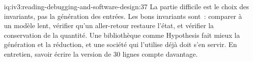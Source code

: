 \begin{solution}{iq:iv3:reading-debugging-and-software-design:37}
La partie difficile est le choix des invariants, pas la génération des entrées. Les bons invariants sont~: comparer à un modèle lent, vérifier qu'un aller-retour restaure l'état, et vérifier la conservation de la quantité. Une bibliothèque comme Hypothesis fait mieux la génération et la réduction, et une société qui l'utilise déjà doit s'en servir. En entretien, savoir écrire la version de 30 lignes compte davantage.


\end{solution}

